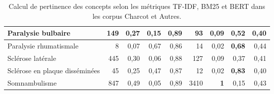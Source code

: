 \begin{landscape}
\begin{table}[]
\begin{tabular}{|l|cccc|cccc|}
Paralysie bulbaire                                     & \multicolumn{1}{r|}{149}         & \multicolumn{1}{r|}{0,27}   & \multicolumn{1}{r|}{0,15} & \multicolumn{1}{r|}{0,89}     & \multicolumn{1}{r|}{93}         & \multicolumn{1}{r|}{0,09}   & \multicolumn{1}{r|}{0,52} & \multicolumn{1}{r|}{0,40}      \\ \hline
Paralysie rhumatismale                                 & \multicolumn{1}{r|}{8}         & \multicolumn{1}{r|}{0,07}      & \multicolumn{1}{r|}{0,67}    & \multicolumn{1}{r|}{0,86}         & \multicolumn{1}{r|}{14}         & \multicolumn{1}{r|}{0,02}   & \multicolumn{1}{r|}{\textbf{0,68}} & \multicolumn{1}{r|}{0,44}      \\ \hline
Sclérose latérale                                      & \multicolumn{1}{r|}{445}        & \multicolumn{1}{r|}{0,30}   & \multicolumn{1}{r|}{0,06} & \multicolumn{1}{r|}{0,88}      & \multicolumn{1}{r|}{127}         & \multicolumn{1}{r|}{0,09}   & \multicolumn{1}{r|}{0,37} & \multicolumn{1}{r|}{0,41}      \\ \hline
Sclérose en plaque disséminées                         & \multicolumn{1}{r|}{45}         & \multicolumn{1}{r|}{0,25}   & \multicolumn{1}{r|}{0,47} & \multicolumn{1}{r|}{0,87}      & \multicolumn{1}{r|}{12}         & \multicolumn{1}{r|}{0,02}   & \multicolumn{1}{r|}{\textbf{0,83}}    & \multicolumn{1}{r|}{0,40}      \\ \hline
Somnambulisme                                          & \multicolumn{1}{r|}{847}        & \multicolumn{1}{r|}{0,49}   & \multicolumn{1}{r|}{0,05} & \multicolumn{1}{r|}{0,89}      & \multicolumn{1}{r|}{3410}       & \multicolumn{1}{r|}{\textbf{1}}   & \multicolumn{1}{r|}{0,15} & \multicolumn{1}{r|}{0,43}      \\ \hline
\end{tabular}
\caption{Calcul de pertinence des concepts selon les métriques \textsc{TF-IDF}, \textsc{BM25} et \textsc{BERT} dans les corpus \og{}Charcot\fg{} et \og{}Autres\fg{}.}
\end{table}
\label{tab:calculs_stat}
\end{landscape}


